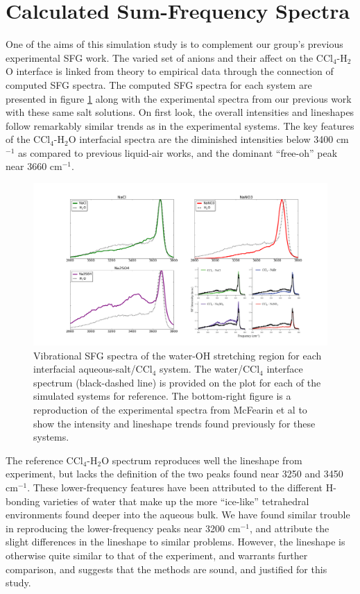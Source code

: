 \section{Calculated Sum-Frequency Spectra}

One of the aims of this simulation study is to complement our group's previous experimental SFG work.\cite{McFearing2009} The varied set of anions and their affect on the CCl$_4$-H$_2$O interface is linked from theory to empirical data through the connection of computed SFG spectra. The computed SFG spectra for each system are presented in figure \ref{fig:sfg-spectra} along with the experimental spectra from our previous work with these same salt solutions.\cite{McFearin2009} On first look, the overall intensities and lineshapes follow remarkably similar trends as in the experimental systems. The key features of the CCl$_4$-H$_2$O interfacial spectra are the diminished intensities below 3400 cm$^{-1}$ as compared to previous liquid-air works, and the dominant ``free-oh'' peak near 3660 cm$^{-1}$.

\begin{figure}[h!]
\begin{center}
	\includegraphics[scale=0.25]{images/sfg-spectra.png}
	\caption{Vibrational SFG spectra of the water-OH stretching region for each interfacial aqueous-salt/CCl$_4$ system. The water/CCl$_4$ interface spectrum (black-dashed line) is provided on the plot for each of the simulated systems for reference. The bottom-right figure is a reproduction of the experimental spectra from McFearin et al to show the intensity and lineshape trends found previously for these systems.\cite{McFearin2009}}
	\label{fig:sfg-spectra}
\end{center}
\end{figure}

The reference CCl$_4$-H$_2$O spectrum reproduces well the lineshape from experiment, but lacks the definition of the two peaks found near 3250 and 3450 cm$^{-1}$. These lower-frequency features have been attributed to the different H-bonding varieties of water that make up the more ``ice-like'' tetrahedral environments found deeper into the aqueous bulk. We have found similar trouble in reproducing the lower-frequency peaks near 3200 cm$^{-1}$, and attribute the slight differences in the lineshape to similar problems.\cite{Walker2006b} However, the lineshape is otherwise quite similar to that of the experiment, and warrants further comparison, and suggests that the methods are sound, and justified for this study.

